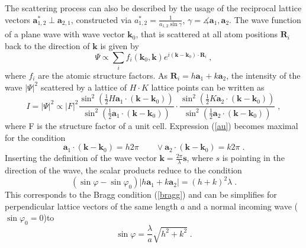 \documentclass[a4paper]{scrartcl}
\numberwithin{equation}{section}
\numberwithin{figure}{section}
\numberwithin{table}{section}
\newcommand{\eq}[2]{\begin{equation}#1\label{#2}\end{equation}}
\newcommand{\Formel}[1]{(\ref{#1})}
\newcommand{\ve}[1]{\mathbf{ #1} }
\begin{document}
The scattering process can also be described by the usage of the reciprocal lattice vectors $\ve a_{1,2}^* \perp \ve a_{2,1}$, constructed via
$a_{1,2}^*=\frac{1}{a_{1,2} \sin \gamma} $, $\gamma = \measuredangle \ve a_1, \ve a_2 $. The wave function of a plane wave with wave vector $\ve k_0$, that is scattered at all atom positions $\ve R_i$ back to the direction of $\ve k$ is given by
\eq{\Psi \propto \sum_{i} f_i(\ve k_0, \ve k) e^{i(\ve k - \ve k_0) \cdot \ve R_i} \ ,}{}
where $f_i$ are the atomic structure factors. As $\ve R_i=h \ve a_1 + k \ve a_2$, the intensity of the wave $|\Psi|^2$ scattered by a lattice of $H \cdot K$ lattice points can be written as
\eq{I=|\Psi|^2 \propto |F|^2 \frac{\sin^2 \left( \tfrac 1 2 H \ve a_1 \cdot (\ve k - \ve k_0) \right)}{\sin^2 \left( \tfrac 1 2 \ve a_1 \cdot ( \ve k - \ve k_0 ) \right)} \cdot \frac{\sin^2 \left( \tfrac 1 2 K \ve a_2 \cdot (\ve k - \ve k_0) \right)} {\sin^2 \left( \tfrac 1 2 \ve a_2 \cdot ( \ve k - \ve k_0 ) \right)} \; , } {}
where F is the structure factor of a unit cell. Expression \Formel{au} becomes  maximal for the condition
\eq{\ve a_1 \cdot (\ve k - \ve k_0) = h 2 \pi \qquad \vee \ve a_2 \cdot (\ve k - \ve k_0) = k 2 \pi \;.}{}
Inserting the definition of the wave vector $\ve k=\frac{2\pi}{\lambda} \ve s$, where $s$ is pointing in the direction of the wave, the scalar products reduce to the condition
\eq{(\sin \varphi - \sin \varphi_0) |h \ve a_1 + k \ve a_2| = (h + k)^2 \lambda \; .} {}
This corresponds to the Bragg condition \Formel{bragg} and can be simplifies for perpendicular lattice vectors of the same length $a$ and a normal incoming wave ($\sin \varphi_0  =0$)to
\eq{\sin \varphi =\frac{\lambda}{a} \sqrt{h^2+k^2} \; .}{}
\end{document}
